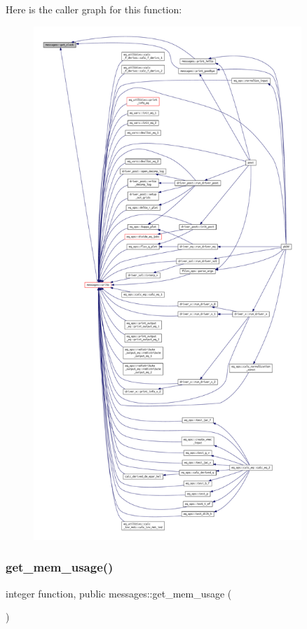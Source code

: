 Here is the caller graph for this function\+:\nopagebreak
\begin{figure}[H]
\begin{center}
\leavevmode
\includegraphics[height=550pt]{namespacemessages_a61fd0b51b5e37d58fdc993c01792a3fd_icgraph}
\end{center}
\end{figure}
\mbox{\label{namespacemessages_a82dddaab795b78b3d39e1ff1aab2f665}} 
\subsubsection{\texorpdfstring{get\+\_\+mem\+\_\+usage()}{get\_mem\_usage()}}
{\footnotesize\ttfamily integer function, public messages\+::get\+\_\+mem\+\_\+usage (\begin{DoxyParamCaption}{ }\end{DoxyParamCaption})}



